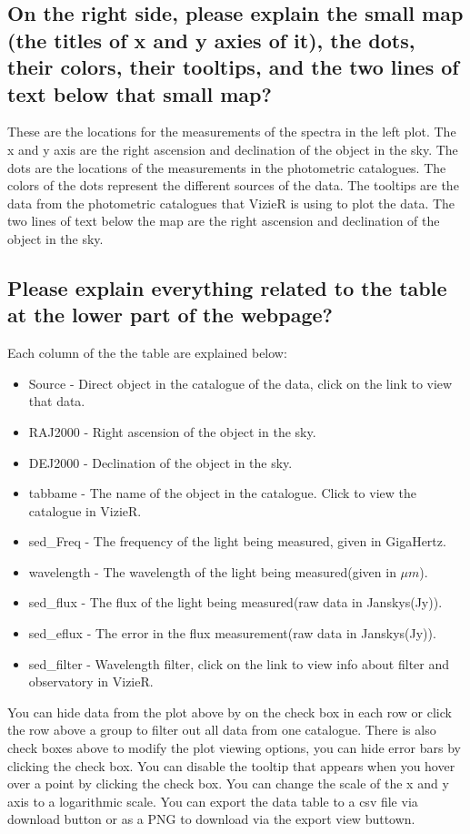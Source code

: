 \documentclass[12pt,oneside,a4paper,english]{article}
\begin{document}
\subsection{On the right side, please explain the small map (the titles of x and y axies of it), the dots, their colors, their tooltips, and the two lines of text below that small map?}
These are the locations for the measurements of the spectra in the left plot. The x and y axis are the right ascension and declination of the object in the sky. The dots are the locations of the measurements in the photometric catalogues. The colors of the dots represent the different sources of the data. The tooltips are the data from the photometric catalogues that VizieR is using to plot the data. The two lines of text below the map are the right ascension and declination of the object in the sky.
\subsection{Please explain everything related to the table at the lower part of the webpage?}
Each column of the the table are explained below:
\begin{itemize}
    \item Source - Direct object in the catalogue of the data, click on the link to view that data.
    \item RAJ2000 - Right ascension of the object in the sky.
    \item DEJ2000 - Declination of the object in the sky.
    \item tabbame - The name of the object in the catalogue. Click to view the catalogue in VizieR.
    \item sed\_Freq - The frequency of the light being measured, given in GigaHertz.
    \item wavelength - The wavelength of the light being measured(given in $\mu m$).
    \item sed\_flux - The flux of the light being measured(raw data in Janskys(Jy)).
    \item sed\_eflux - The error in the flux measurement(raw data in Janskys(Jy)).
    \item sed\_filter - Wavelength filter, click on the link to view info about filter and observatory in VizieR.
\end{itemize}
You can hide data from the plot above by on the check box in each row or click the row above a group to filter out all data from one catalogue. There is also check boxes above to modify the plot viewing options, you can hide error bars by clicking the check box. You can disable the tooltip that appears when you hover over a point by clicking the check box. You can change the scale of the x and y axis to a logarithmic scale. You can export the data table to a csv file via download button or as a PNG to download via the export view buttown.
\end{document}
